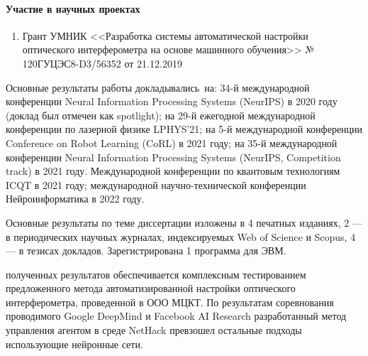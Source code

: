 \paragraph{Участие в научных проектах}
\begin{enumerate}[labelindent=3pt, labelsep=10pt, topsep=10pt, itemsep=5pt]
    \item Грант УМНИК <<Разработка системы автоматической настройки оптического интерферометра на основе машинного обучения>> № 120ГУЦЭС8-D3/56352 от 21.12.2019

\end{enumerate}
\else 

{\probation} Основные результаты работы докладывались~на: 34-й международной конференции Neural Information Processing Systems (NeurIPS) в 2020 году (доклад был отмечен как spotlight); на 29-й ежегодной международной конференции по лазерной физике LPHYS'21; на 5-й международной конференции Conference on Robot Learning (CoRL) в 2021 году; на 35-й международной конференции Neural Information Processing Systems (NeurIPS, Competition track) в 2021 году. Международной конференции по квантовым технологиям ICQT в 2021 году; международной научно-технической конференции Нейроинформатика в 2022 году.

{\publications} Основные результаты по теме диссертации изложены в 4 печатных изданиях, 2 — в периодических научных журналах, индексируемых Web of Science и Scopus, 4 — в тезисах докладов. Зарегистрирована 1 программа для ЭВМ.
\fi

{\reliability} полученных результатов обеспечивается комплексным тестированием предложенного метода автоматизированной настройки оптического интерферометра, проведенной в ООО МЦКТ. По результатам 
соревнования проводимого Google DeepMind и Facebook AI Research разработанный метод управления агентом в среде NetHack превзошел остальные подходы использующие нейронные сети. 
